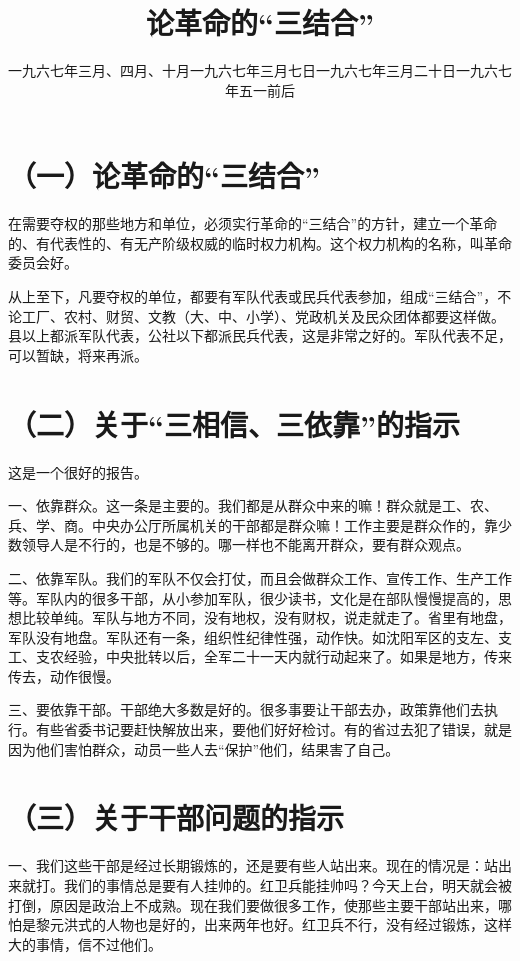 
\title{论革命的“三结合”}
\date{一九六七年三月、四月、十月}
\maketitle


\date{一九六七年三月七日}
\section*{（一）论革命的“三结合”}

在需要夺权的那些地方和单位，必须实行革命的“三结合”的方针，建立一个革命的、有代表性的、有无产阶级权威的临时权力机构。这个权力机构的名称，叫革命委员会好。

从上至下，凡要夺权的单位，都要有军队代表或民兵代表参加，组成“三结合”，不论工厂、农村、财贸、文教（大、中、小学）、党政机关及民众团体都要这样做。县以上都派军队代表，公社以下都派民兵代表，这是非常之好的。军队代表不足，可以暂缺，将来再派。

\date{一九六七年三月二十日}
\section*{（二）关于“三相信、三依靠”的指示}

这是一个很好的报告。

一、依靠群众。这一条是主要的。我们都是从群众中来的嘛！群众就是工、农、兵、学、商。中央办公厅所属机关的干部都是群众嘛！工作主要是群众作的，靠少数领导人是不行的，也是不够的。哪一样也不能离开群众，要有群众观点。

二、依靠军队。我们的军队不仅会打仗，而且会做群众工作、宣传工作、生产工作等。军队内的很多干部，从小参加军队，很少读书，文化是在部队慢慢提高的，思想比较单纯。军队与地方不同，没有地权，没有财权，说走就走了。省里有地盘，军队没有地盘。军队还有一条，组织性纪律性强，动作快。如沈阳军区的支左、支工、支农经验，中央批转以后，全军二十一天内就行动起来了。如果是地方，传来传去，动作很慢。

三、要依靠干部。干部绝大多数是好的。很多事要让干部去办，政策靠他们去执行。有些省委书记要赶快解放出来，要他们好好检讨。有的省过去犯了错误，就是因为他们害怕群众，动员一些人去“保护”他们，结果害了自己。

\date{一九六七年五一前后}
\section*{（三）关于干部问题的指示}

一、我们这些干部是经过长期锻炼的，还是要有些人站出来。现在的情况是：站出来就打。我们的事情总是要有人挂帅的。红卫兵能挂帅吗？今天上台，明天就会被打倒，原因是政治上不成熟。现在我们要做很多工作，使那些主要干部站出来，哪怕是黎元洪式的人物也是好的，出来两年也好。红卫兵不行，没有经过锻炼，这样大的事情，信不过他们。


